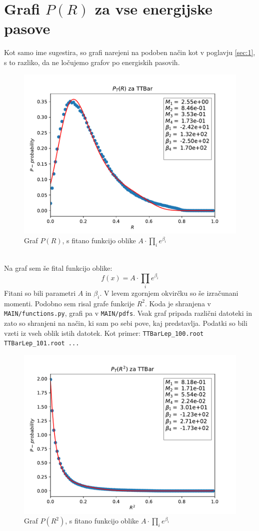 \section{Grafi $P(R)$ za vse energijske pasove}
Kot samo ime sugestira, so grafi narejeni na podoben način kot v poglavju \ref{sec:1},
s to razliko, da ne ločujemo grafov po energiskih pasovih.
\begin{figure}[h]
    \begin{center}
        \includegraphics[width=13cm]{sections/section5/figures/pt_R-TTBar.pdf}
        \caption{Graf $P(R)$, s fitano funkcijo oblike $A \cdot \prod_i e^{\beta_i}$}
        \label{slika 7}
    \end{center}
\end{figure}
\\
Na graf sem še fital funkcijo oblike:
\begin{equation}
    f(x) = A \cdot \prod_i e^{\beta_i}
\end{equation}
Fitani so bili parametri $A$ in $\beta_i$. V levem zgornjem okvirčku so še izračunani momenti.
Podobno sem risal grafe funkcije $R^2$.
Koda je shranjena v \verb|MAIN/functions.py|, grafi pa v \verb|MAIN/pdfs|. Vsak graf pripada različni datoteki
in zato so shranjeni na način, ki sam po sebi pove, kaj predstavlja. Podatki so bili vzeti iz vseh oblik istih datotek.
Kot primer: \verb|TTBarLep_100.root TTBarLep_101.root ...|
\newpage\noindent
\begin{figure}[h]
    \begin{center}
        \includegraphics[width=13cm]{sections/section5/figures/pt_R2-TTBar.pdf}
        \caption{Graf $P(R^2)$, s fitano funkcijo oblike $A \cdot \prod_i e^{\beta_i}$}
        \label{slika 8}
    \end{center}
\end{figure}